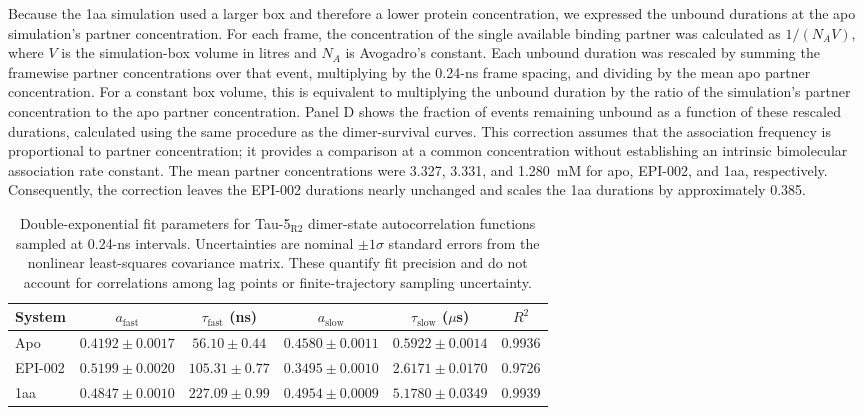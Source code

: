 \documentclass[11pt]{article}
\newcommand{\tauR}{Tau-5$_{\mathrm{R2}}$}
\begin{document}
Because the 1aa simulation used a larger box and therefore a lower protein concentration, we expressed the unbound durations at the apo simulation's partner concentration. For each frame, the concentration of the single available binding partner was calculated as $1/(N_A V)$, where $V$ is the simulation-box volume in litres and $N_A$ is Avogadro's constant. Each unbound duration was rescaled by summing the framewise partner concentrations over that event, multiplying by the 0.24-ns frame spacing, and dividing by the mean apo partner concentration. For a constant box volume, this is equivalent to multiplying the unbound duration by the ratio of the simulation's partner concentration to the apo partner concentration. Panel D shows the fraction of events remaining unbound as a function of these rescaled durations, calculated using the same procedure as the dimer-survival curves. This correction assumes that the association frequency is proportional to partner concentration; it provides a comparison at a common concentration without establishing an intrinsic bimolecular association rate constant. The mean partner concentrations were 3.327, 3.331, and 1.280~mM for apo, EPI-002, and 1aa, respectively. Consequently, the correction leaves the EPI-002 durations nearly unchanged and scales the 1aa durations by approximately 0.385.

\begin{table}[htbp]
\centering
\caption{Double-exponential fit parameters for \tauR{} dimer-state autocorrelation functions sampled at 0.24-ns intervals. Uncertainties are nominal $\pm1\sigma$ standard errors from the nonlinear least-squares covariance matrix. These quantify fit precision and do not account for correlations among lag points or finite-trajectory sampling uncertainty.}
\label{tab:fits}
\small
\begin{tabular}{lccccc}
\toprule
System & $a_{\mathrm{fast}}$ & $\tau_{\mathrm{fast}}$ (ns) & $a_{\mathrm{slow}}$ & $\tau_{\mathrm{slow}}$ ($\mu$s) & $R^2$ \\
\midrule
Apo & $0.4192 \pm 0.0017$ & $56.10 \pm 0.44$ & $0.4580 \pm 0.0011$ & $0.5922 \pm 0.0014$ & 0.9936 \\
EPI-002 & $0.5199 \pm 0.0020$ & $105.31 \pm 0.77$ & $0.3495 \pm 0.0010$ & $2.6171 \pm 0.0170$ & 0.9726 \\
1aa & $0.4847 \pm 0.0010$ & $227.09 \pm 0.99$ & $0.4954 \pm 0.0009$ & $5.1780 \pm 0.0349$ & 0.9939 \\
\bottomrule
\end{tabular}
\end{table}
\end{document}
